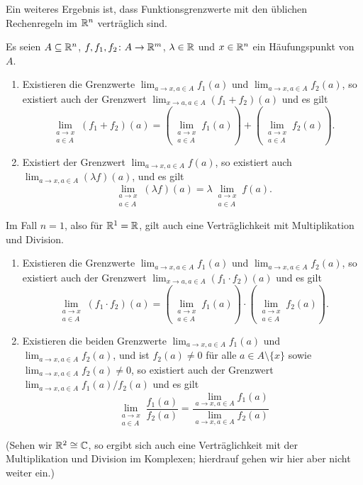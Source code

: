 \documentclass[a4paper,10pt]{article}
\begin{document}
Ein weiteres Ergebnis ist, dass Funktionsgrenzwerte mit den üblichen Rechenregeln im $\mathbb{R}^n$ verträglich sind.


\begin{prop}
 Es seien $A \subseteq \mathbb{R}^n$, $f, f_1, f_2 \colon A \to \mathbb{R}^m$, $\lambda \in \mathbb{R}$ und $x \in \mathbb{R}^n$ ein Häufungspunkt von $A$.
 \begin{enumerate}
  \item
   Existieren die Grenzwerte $\lim_{a \to x, a \in A} f_1(a)$ und $\lim_{a \to x, a \in A} f_2(a)$, so existiert auch der Grenzwert $\lim_{x \to a, a \in A} (f_1 + f_2)(a)$ und es gilt
   \[
    \lim_{\substack{a \to x \\ a \in A}} (f_1 + f_2)(a)
    =
    \left( \lim_{\substack{a \to x \\ a \in A}} f_1(a) \right)
    + \left( \lim_{\substack{a \to x \\ a \in A}} f_2(a) \right).
   \]
  \item
   Existiert der Grenzwert $\lim_{a \to x, a \in A} f(a)$, so existiert auch $\lim_{a \to x, a \in A} (\lambda f)(a)$, und es gilt
   \[
    \lim_{\substack{a \to x \\ a \in A}} (\lambda f)(a)
    = \lambda \lim_{\substack{a \to x \\ a \in A}} f(a).
   \]
 \end{enumerate}
 Im Fall $n = 1$, also für $\mathbb{R}^1 = \mathbb{R}$, gilt auch eine Verträglichkeit mit Multiplikation und Division.
 \begin{enumerate}[resume]
  \item
   Existieren die Grenzwerte $\lim_{a \to x, a \in A} f_1(a)$ und $\lim_{a \to x, a \in A} f_2(a)$, so existiert auch der Grenzwert $\lim_{x \to a, a \in A} (f_1 \cdot f_2)(a)$ und es gilt
   \[
    \lim_{\substack{a \to x \\ a \in A}} (f_1 \cdot f_2)(a)
    =
    \left( \lim_{\substack{a \to x \\ a \in A}} f_1(a) \right)
    \cdot \left( \lim_{\substack{a \to x \\ a \in A}} f_2(a) \right).
   \]
  \item
   Existieren die beiden Grenzwerte $\lim_{a \to x, a \in A} f_1(a)$ und $\lim_{a \to x, a \in A} f_2(a)$, und ist \mbox{$f_2(a) \neq 0$} für alle $a \in A \setminus \{x\}$ sowie $\lim_{a \to x, a \in A} f_2(a) \neq 0$, so existiert auch der Grenzwert $\lim_{a \to x, a \in A} f_1(a)/f_2(a)$ und es gilt
   \[
    \lim_{\substack{a \to x \\ a \in A}} \frac{f_1(a)}{f_2(a)}
    = \frac{\lim_{a \to x, a \in A} f_1(a)}{\lim_{a \to x, a \in A} f_2(a)}
   \]
 \end{enumerate}
 (Sehen wir $\mathbb{R}^2 \cong \mathbb{C}$, so ergibt sich auch eine Verträglichkeit mit der Multiplikation und Division im Komplexen; hierdrauf gehen wir hier aber nicht weiter ein.)
\end{prop}
\end{document}
